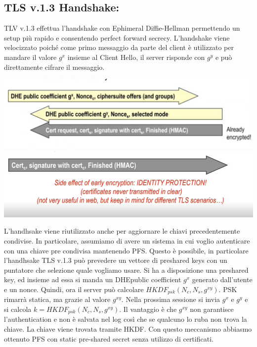 \documentclass{book}
\theoremstyle{remark}
\begin{document}
\subsection{TLS v\@.1\@.3 Handshake:}
TLV v\@.1\@.3 effettua l'handshake con Ephimeral Diffie-Hellman permettendo un setup più rapido e consentendo perfect forward secrecy\@. L'handshake viene velocizzato poiché come primo messaggio da parte del client è utilizzato per mandare il valore \(g^x\) insieme al Client Hello, il server risponde con \(g^y\) e può direttamente cifrare il messaggio\@.
\begin{center}
	\includegraphics[scale=0.6]{2021-12-11-18-04-13.png}\newline
	\includegraphics[scale=0.6]{2021-12-11-18-07-14.png}
\end{center}
L'handhsake viene riutilizzato anche per aggiornare le chiavi precedentemente condivise\@. In particolare, assumiamo di avere un sistema in cui voglio autenticare con una chiave pre condivisa mantenendo PFS\@. Questo è possibile, in particolare l'handhsake TLS v\@.1\@.3 può prevedere un vettore di preshared keys con un puntatore che selezione quale vogliamo usare\@. Si ha a disposizione una preshared key, ed insieme ad essa si manda un DHEpublic coefficient \(g^x\) generato dall'utente e un nonce\@. Quindi, ora il server può calcolare \(HKDF_{psk}(N_c,N_s,g^{xy})\)\@. PSK rimarrà statica, ma grazie al valore \(g^{xy}\)\@. Nella prossima sessione si invia \(g^x\) e \(g^y\) e si calcola \(k=HKDF_{psk}(N_c,N_s,g^{xy})\)\@. Il vantaggio è che \(g^{xy}\) non garantisce l'authentication e non è salvata nel log così che se qualcuno lo ruba non trova la chiave\@. La chiave viene trovata tramite HKDF\@.\newline
Con questo meccanismo abbiasmo	 ottenuto PFS con static pre-shared secret senza utilizzo di certificati\@.
\end{document}

